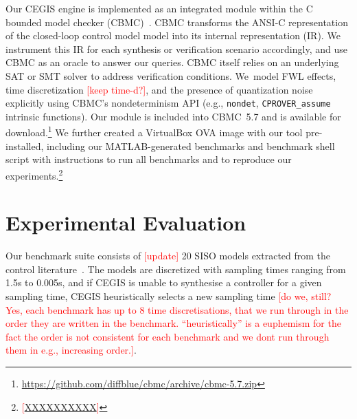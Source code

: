 \documentclass[twocolumn]{autart}    %
\renewcommand{\note}[1]{\textcolor{red}{[#1]}}
\begin{document}
Our CEGIS engine is implemented as an integrated module within the C bounded
model checker (CBMC)~\cite{ClarkeKL04}.  CBMC transforms the ANSI-C representation
of the closed-loop control model model into its internal representation (IR).  We
instrument this IR for each synthesis or verification scenario accordingly,
and use CBMC as an oracle to answer our queries.  CBMC itself relies on an
underlying SAT or SMT solver to address verification conditions.  We~model FWL
effects, time discretization \note{keep time-d?}, and the presence of quantization noise
explicitly using CBMC's nondeterminism API (e.g., \texttt{nondet},
\texttt{CPROVER\_assume} intrinsic functions).  Our module is included into
CBMC~5.7 and is available for
download.\footnote{\url{https://github.com/diffblue/cbmc/archive/cbmc-5.7.zip}}
We further created a VirtualBox OVA image with our tool pre-installed,
including our MATLAB-generated benchmarks and benchmark shell script with
instructions to run all benchmarks and to reproduce our
experiments.\footnote{\note{\url{XXXXXXXXXX}}}
%
%

\section{Experimental Evaluation}
\label{exp:evaluation}

Our benchmark suite consists of \note{update} 20 SISO models extracted from the 
control literature~\cite{acrobot,cstr,CHEN1979389,KOKOTOVIC198023,gajic2008optimal,Franklin15, maglev, converters, CTMS, gajic2008optimal}.
The models are discretized with sampling times ranging from 1.5s to 0.005s, and if CEGIS is unable to 
synthesise a controller for a given sampling time, CEGIS heuristically selects a new sampling time \note{do we, still? Yes, each benchmark has up to 8 time discretisations, that we run through in the order they are written in the benchmark. ``heuristically'' is a euphemism for the fact the order is not consistent for each benchmark and we dont run through them in e.g., increasing order.}.
\end{document}
